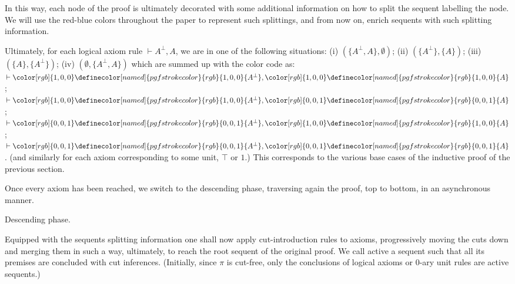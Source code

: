  
 
In this way, each node of the proof is ultimately decorated with some additional information on how to split the sequent labelling the node. We will use the red-blue colors throughout the paper to represent such splittings, and from now on, enrich sequents with such splitting information.\par
 
 
 
Ultimately, for each logical axiom rule $\vdash A^{\perp},A$, we are in one of the following situations: (i) $(\{A^{\perp},A\},\emptyset)$; (ii) $(\{A^{\perp}\},\{A\})$; (iii) $(\{A\},\{A^{\perp}\})$; (iv) $(\emptyset,\{A^{\perp},A\})$ which are summed up with the color code as: $\vdash{\color[rgb]{1,0,0}\definecolor[named]{pgfstrokecolor}{rgb}{1,0,0}{{A^{\perp}}}},{\color[rgb]{1,0,0}\definecolor[named]{pgfstrokecolor}{rgb}{1,0,0}{{A}}}$; $\vdash{\color[rgb]{1,0,0}\definecolor[named]{pgfstrokecolor}{rgb}{1,0,0}{{A^{\perp}}}},{\color[rgb]{0,0,1}\definecolor[named]{pgfstrokecolor}{rgb}{0,0,1}{{A}}}$; $\vdash{\color[rgb]{0,0,1}\definecolor[named]{pgfstrokecolor}{rgb}{0,0,1}{{A^{\perp}}}},{\color[rgb]{1,0,0}\definecolor[named]{pgfstrokecolor}{rgb}{1,0,0}{{A}}}$; $\vdash{\color[rgb]{0,0,1}\definecolor[named]{pgfstrokecolor}{rgb}{0,0,1}{{A^{\perp}}}},{\color[rgb]{0,0,1}\definecolor[named]{pgfstrokecolor}{rgb}{0,0,1}{{A}}}$. (and similarly for each axiom corresponding to some unit, $\top$ or $1$.) This corresponds to the various base cases of the inductive proof of the previous section.\par
 
 
 
Once every axiom has been reached, we switch to the descending phase, traversing again the proof, top to bottom, in an asynchronous manner.\par
 
  Descending phase.  
 
Equipped with the sequents splitting information one shall now apply cut-introduction rules to axioms, progressively moving the cuts down and merging them in such a way, ultimately, to reach the root sequent of the original proof. We call active a sequent such that all its premises are concluded with cut inferences. (Initially, since $\pi$ is cut-free, only the conclusions of logical axioms or 0-ary unit rules are active sequents.)\par
 
